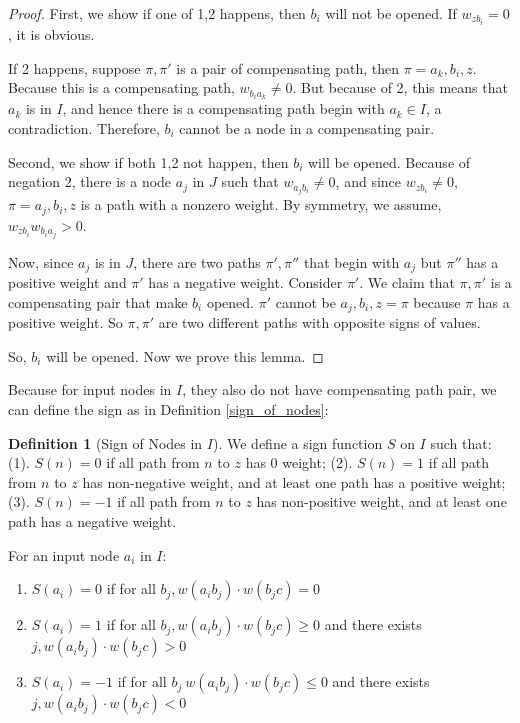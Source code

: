 \documentclass[]{article}
\theoremstyle{definition}
\newtheorem{definition}{Definition}
\begin{document}
\begin{proof}
	First, we show if one of 1,2 happens, then $b_i$ will not be opened. If $w_{zb_i}=0$, it is obvious.
	
	If 2 happens, suppose $\pi,\pi'$ is a pair of compensating path, then $\pi = a_k,b_i,z$. Because this is a compensating path, $w_{b_ia_k}\neq 0$. But because of 2, this means that $a_k$ is in $I$, and hence there is a compensating path begin with $a_k\in I$, a contradiction. Therefore, $b_i$ cannot be a node in a compensating pair.
	
	Second, we show if both 1,2 not happen, then $b_i$ will be opened. Because of negation 2, there is a node $a_j$ in $J$ such that $w_{a_jb_i}\neq 0$, and since $w_{zb_i}\neq 0$, $\pi=a_j,b_i,z$ is a path with a  nonzero weight. By symmetry, we assume, $w_{zb_i}w_{b_ia_j}>0$. 
	
	Now, since $a_j$ is in $J$, there are two paths $\pi',\pi''$ that begin with $a_j$ but $\pi''$ has a positive weight and $\pi'$ has a negative weight. Consider $\pi'$. We claim that $\pi,\pi'$ is a compensating pair that make $b_i$ opened. $\pi'$ cannot be $a_j,b_i,z=\pi$ because $\pi$ has a positive weight. So $\pi,\pi'$ are two different paths with opposite signs of values.
	
	So, $b_i$ will be opened. Now we prove this lemma. 
\end{proof}


Because for input nodes in $I$, they also do not have compensating path pair, we can define the sign as in Definition \ref{sign_of_nodes}:

\begin{definition}[Sign of Nodes in $I$]\label{sign_of_nodes_in_I}
	We define a sign function $S$ on $I$ such that: 	(1). $S(n)=0$ if all path from $n$ to $z$ has 0 weight; (2). $S(n)=1$ if all path from $n$ to $z$ has non-negative weight, and at least one path has a positive weight; (3). $S(n)=-1$ if all path from $n$ to $z$ has non-positive weight, and at least one path has a negative weight. 
	
	
	For an input node $a_i$ in $I$:
	\begin{enumerate}
		\item  $S(a_i)=0$ if 
		for all $b_j, w(a_i b_j)\cdot w(b_j c) = 0$
		
		
		\item  $S(a_i)=1$ if for all $b_j, w(a_i b_j)\cdot w(b_j c) \geq 0$ and there exists 
		$j, w(a_i b_j)\cdot w(b_j c) > 0$
		
		\item $S(a_i)=-1$ if for all $b_j\ w(a_i b_j)\cdot w(b_j c) \leq 0$ and there exists 
		$j, w(a_i b_j)\cdot w(b_j c) < 0$ 
	\end{enumerate}
\end{definition}
\end{document}
